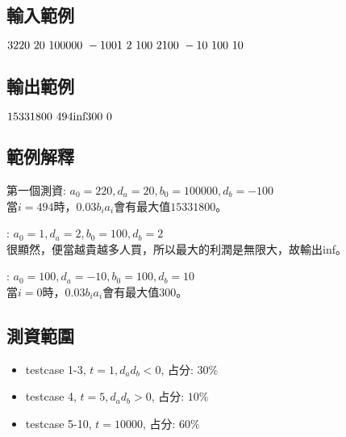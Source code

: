 \documentclass{article}
\begin{document}
\begin{CJK*}{UTF8}{bsmi}
\subsection*{輸入範例}
$3\\220\ 20\ 100000\ -100\\1\ 2\ 100\ 2\\100\ -10\ 100\ 10$

\subsection*{輸出範例}
$15331800\ 494\\\text{inf}\\300\ 0$

\subsection*{範例解釋}
第一個測資: $a_0=220,d_a=20,b_0=100000,d_b=-100$\\
當$i=494$時，$0.03b_ia_i$會有最大值$15331800$。

: $a_0=1,d_a=2,b_0=100,d_b=2$\\
很顯然，便當越貴越多人買，所以最大的利潤是無限大，故輸出inf。

: $a_0=100,d_a=-10,b_0=100,d_b=10$\\
當$i=0$時，$0.03b_ia_i$會有最大值$300$。

\subsection*{測資範圍}
\begin{itemize}
    \item testcase 1-3, $t=1,d_ad_b<0$, 占分: $30\%$
    \item testcase 4, $t=5,d_ad_b>0$, 占分: $10\%$
    \item testcase 5-10, $t=10000$, 占分: $60\%$
\end{itemize}

\end{CJK*}
\end{document}
